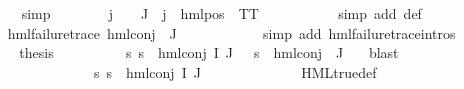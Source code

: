 \begin{isabellebody}
\ \ \ \ \ \ \ \ \isamarkupfalse%
\ simp\isanewline
\ \ \ \ \ \ \isamarkupfalse%
\ {\isachardoublequoteopen}{\isasymforall}j\ {\isasymin}\ {\isasymPsi}\ {\isacharbackquote}{\kern0pt}\ J{\isachardot}{\kern0pt}\ {\isasymexists}{\isasymalpha}{\isachardot}{\kern0pt}\ j\ {\isacharequal}{\kern0pt}\ {\isacharparenleft}{\kern0pt}hml{\isacharunderscore}{\kern0pt}pos\ {\isasymalpha}\ TT{\isacharparenright}{\kern0pt}{\isachardoublequoteclose}\ \isanewline
\ \ \ \ \ \ \ \ \isamarkupfalse%
\ {\isacharparenleft}{\kern0pt}simp\ add{\isacharcolon}{\kern0pt}\ {\isasymPsi}{\isacharunderscore}{\kern0pt}def{\isacharparenright}{\kern0pt}\isanewline
\ \ \ \ \ \ \isamarkupfalse%
\ {\isachardoublequoteopen}hml{\isacharunderscore}{\kern0pt}failure{\isacharunderscore}{\kern0pt}trace\ {\isacharparenleft}{\kern0pt}hml{\isacharunderscore}{\kern0pt}conj\ {\isacharbraceleft}{\kern0pt}{\isacharbraceright}{\kern0pt}\ J\ {\isasymPsi}{\isacharparenright}{\kern0pt}{\isachardoublequoteclose}\ \isanewline
\ \ \ \ \ \ \ \ \isamarkupfalse%
\ {\isacharparenleft}{\kern0pt}simp\ add{\isacharcolon}{\kern0pt}\ hml{\isacharunderscore}{\kern0pt}failure{\isacharunderscore}{\kern0pt}trace{\isachardot}{\kern0pt}intros{\isacharparenleft}{\kern0pt}{}{\isacharparenright}{\kern0pt}{\isacharparenright}{\kern0pt}\isanewline
\ \ \ \ \ \ \isamarkupfalse%
\ \isamarkupfalse%
\ {\isacharquery}{\kern0pt}thesis\isanewline
\ \ \ \ \ \ \ \ \isamarkupfalse%
\ {\isacartoucheopen}{\isasymforall}s{\isachardot}{\kern0pt}\ {\isacharparenleft}{\kern0pt}s\ {\isasymTurnstile}\ hml{\isacharunderscore}{\kern0pt}conj\ I\ J\ {\isasymPhi}{\isacharparenright}{\kern0pt}\ {\isacharequal}{\kern0pt}\ {\isacharparenleft}{\kern0pt}s\ {\isasymTurnstile}\ hml{\isacharunderscore}{\kern0pt}conj\ {\isacharbraceleft}{\kern0pt}{\isacharbraceright}{\kern0pt}\ J\ {\isasymPsi}{\isacharparenright}{\kern0pt}{\isacartoucheclose}\ \isamarkupfalse%
\ blast\isanewline
\ \ \ \ \ \ \isamarkupfalse%
\isanewline
\ \ \ \ \ \ \ \ \isamarkupfalse%
\ {}\isanewline
\ \ \ \ \ \ \ \ \isamarkupfalse%
\ {\isachardoublequoteopen}{\isasymforall}s{\isachardot}{\kern0pt}\ {\isasymnot}s\ {\isasymTurnstile}\ {\isacharparenleft}{\kern0pt}hml{\isacharunderscore}{\kern0pt}conj\ I\ J\ {\isasymPhi}{\isacharparenright}{\kern0pt}{\isachardoublequoteclose}\ \isanewline
\ \ \ \ \ \ \ \ \ \ \isamarkupfalse%
\ HML{\isacharunderscore}{\kern0pt}true{\isacharunderscore}{\kern0pt}def\ \isanewline

\end{isabellebody}
